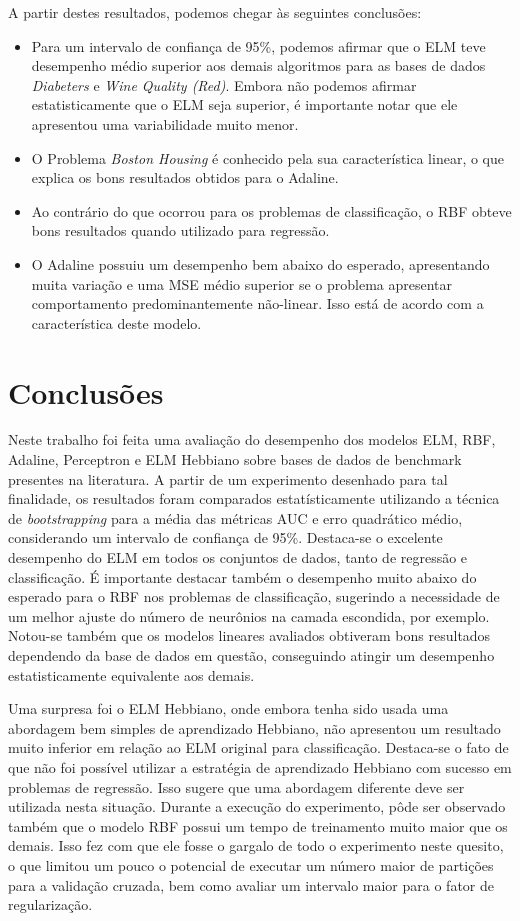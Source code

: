 \documentclass[conference]{IEEEtran}
\begin{document}
	A partir destes resultados, podemos chegar às seguintes conclusões:
	\begin{itemize}
		\item Para um intervalo de confiança de 95\%, podemos afirmar que o ELM teve desempenho médio superior aos demais algoritmos para as bases de dados \textit{Diabeters} e \textit{Wine Quality (Red)}. Embora não podemos afirmar estatisticamente que o ELM seja superior, é importante notar que ele apresentou uma variabilidade muito menor.
		\item O Problema \textit{Boston Housing} é conhecido pela sua característica linear, o que explica os bons resultados obtidos para o Adaline.
		\item Ao contrário do que ocorrou para os problemas de classificação, o RBF obteve bons resultados quando utilizado para regressão.
		\item O Adaline possuiu um desempenho bem abaixo do esperado, apresentando muita variação e uma MSE médio superior se o problema apresentar comportamento predominantemente não-linear. Isso está de acordo com a característica deste modelo.
	\end{itemize}
	
	
	
	\section{Conclusões}
	
	Neste trabalho foi feita uma avaliação do desempenho dos modelos ELM, RBF, Adaline, Perceptron e ELM Hebbiano sobre bases de dados de benchmark presentes na literatura. A partir de um experimento desenhado para tal finalidade, os resultados foram comparados estatísticamente utilizando a técnica de \textit{bootstrapping} para a média das métricas AUC e erro quadrático médio, considerando um intervalo de confiança de 95\%. Destaca-se o excelente desempenho do ELM em todos os conjuntos de dados, tanto de regressão e classificação. É importante destacar também o desempenho muito abaixo do esperado para o RBF nos problemas de classificação, sugerindo a necessidade de um melhor ajuste do número de neurônios na camada escondida, por exemplo. Notou-se também que os modelos lineares avaliados obtiveram bons resultados dependendo da base de dados em questão, conseguindo atingir um desempenho estatisticamente equivalente aos demais.
	
	Uma surpresa foi o ELM Hebbiano, onde embora tenha sido usada uma abordagem bem simples de aprendizado Hebbiano, não apresentou um resultado muito inferior em relação ao ELM original para classificação. Destaca-se o fato de que não foi possível utilizar a estratégia de aprendizado Hebbiano com sucesso em problemas de regressão. Isso sugere que uma abordagem diferente deve ser utilizada nesta situação. Durante a execução do experimento, pôde ser observado também que o modelo RBF possui um tempo de treinamento muito maior que os demais. Isso fez com que ele fosse o gargalo de todo o experimento neste quesito, o que limitou um pouco o potencial de executar um número maior de partições para a validação cruzada, bem como avaliar um intervalo maior para o fator de regularização. 
	
\end{document}
